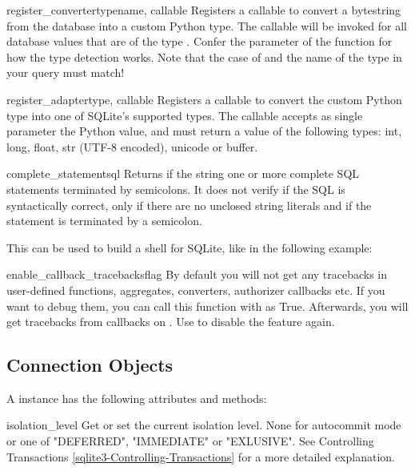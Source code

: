\begin{funcdesc}{register_converter}{typename, callable}
Registers a callable to convert a bytestring from the database into a custom
Python type. The callable will be invoked for all database values that are of
the type . Confer the parameter  of the
 function for how the type detection works. Note that the case of
 and the name of the type in your query must match!
\end{funcdesc}

\begin{funcdesc}{register_adapter}{type, callable}
Registers a callable to convert the custom Python type  into one of
SQLite's supported types. The callable  accepts as single
parameter the Python value, and must return a value of the following types:
int, long, float, str (UTF-8 encoded), unicode or buffer.
\end{funcdesc}

\begin{funcdesc}{complete_statement}{sql}
Returns  if the string  one or more complete SQL
statements terminated by semicolons. It does not verify if the SQL is
syntactically correct, only if there are no unclosed string literals and if the
statement is terminated by a semicolon.

This can be used to build a shell for SQLite, like in the following example:

    
\end{funcdesc}

\begin{funcdesc}{}enable_callback_tracebacks{flag}
By default you will not get any tracebacks in user-defined functions,
aggregates, converters, authorizer callbacks etc. If you want to debug them,
you can call this function with  as True. Afterwards, you will get
tracebacks from callbacks on . Use  to disable
the feature again.
\end{funcdesc}

\subsection{Connection Objects \label{sqlite3-Connection-Objects}}

A  instance has the following attributes and methods:

\label{sqlite3-Connection-IsolationLevel}
\begin{memberdesc}{isolation_level}
  Get or set the current isolation level. None for autocommit mode or one of
  "DEFERRED", "IMMEDIATE" or "EXLUSIVE". See  Controlling Transactions
  \ref{sqlite3-Controlling-Transactions} for a more detailed explanation.
\end{memberdesc}

